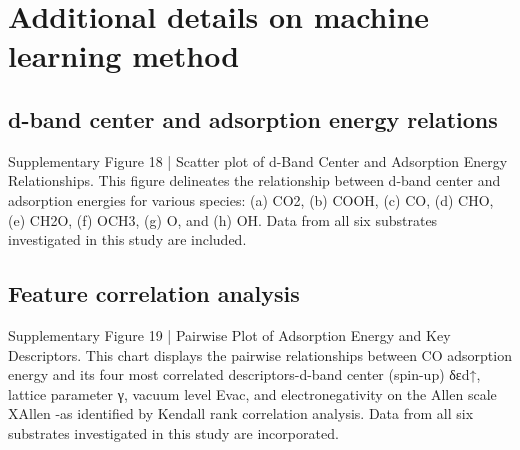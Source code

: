 

\section{Additional details on machine learning method}

\subsection{d-band center and adsorption energy relations}


Supplementary Figure 18 | Scatter plot of d-Band Center and Adsorption Energy Relationships. This figure delineates the relationship between d-band center and adsorption energies for various species: (a) CO2, (b) COOH, (c) CO, (d) CHO, (e) CH2O, (f) OCH3, (g) O, and (h) OH. Data from all six substrates investigated in this study are included.


\subsection{Feature correlation analysis}


Supplementary Figure 19 | Pairwise Plot of Adsorption Energy and Key Descriptors. This chart displays the pairwise relationships between CO adsorption energy and its four most correlated descriptors-d-band center (spin-up) δεd↑, lattice parameter γ, vacuum level Evac, and electronegativity on the Allen scale XAllen -as identified by Kendall rank correlation analysis. Data from all six substrates investigated in this study are incorporated.


